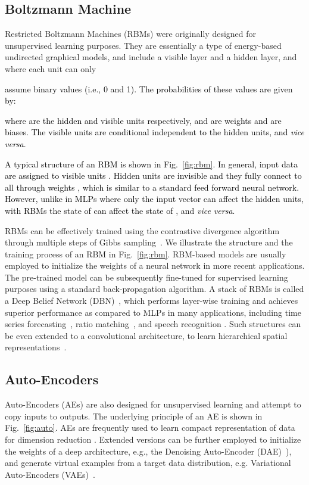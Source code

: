 \documentclass[journal,comsoc,letter]{IEEEtran}
\newcommand{\edit}[1]{\textcolor{black}{#1}}
\newcommand{\rev}[1]{\textcolor{black}{#1}}
\begin{document}
\subsection{Boltzmann Machine}
Restricted Boltzmann Machines (RBMs) \cite{le2008representational} were originally designed for unsupervised learning purposes. They are essentially a type of energy-based undirected graphical models, and include a visible layer and a hidden layer, and where each unit can only \edit{assume binary values (i.e., 0 and 1).
The probabilities of these values are given by:

where  are the hidden and visible units respectively, and  are weights and  are biases. The visible units are conditional independent to the hidden units, and \emph{vice versa}. 
} \rev{A typical structure of an RBM is shown in Fig.~\ref{fig:rbm}. In general, input data are assigned to visible units . Hidden units  are invisible and they fully connect to all  through weights , which is similar to a standard feed forward neural network. However, unlike in MLPs where only the input vector can affect the hidden units, with RBMs the state of  can affect the state of , and \emph{vice versa}.}

RBMs can be effectively trained using the contrastive divergence algorithm~\cite{hinton2002training} through multiple steps of Gibbs sampling~\cite{casella1992explaining}. We illustrate the structure and the training process of an RBM in Fig.~\ref{fig:rbm}. RBM-based models are usually employed to initialize the weights of a neural network in more recent applications. The pre-trained model can be subsequently fine-tuned for supervised learning purposes using a standard back-propagation algorithm. A stack of RBMs is called a Deep Belief Network (DBN)~\cite{hinton2006fast}, which performs layer-wise training and achieves superior performance as compared to MLPs in many applications, including time series forecasting~\cite{kuremoto2014forecast}, ratio matching~\cite{dauphin2013stochastic}, and speech recognition \cite{sainath2011making}. Such structures can be even extended to a convolutional architecture, to learn hierarchical spatial representations~\cite{lee2009convolutional}.

\subsection{Auto-Encoders}
Auto-Encoders (AEs) are also designed for unsupervised learning and attempt to copy inputs to outputs. The underlying principle of an AE is shown in Fig.~\ref{fig:auto}. AEs are frequently used to learn compact representation of data for dimension reduction \cite{bengio2009learning}. Extended versions can be further employed to initialize the weights of a deep architecture, e.g., the Denoising Auto-Encoder (DAE)~\cite{vincent2010stacked}), and generate virtual examples from a target data distribution, e.g. Variational Auto-Encoders (VAEs)~\cite{kingma2014auto}. 
\end{document}
